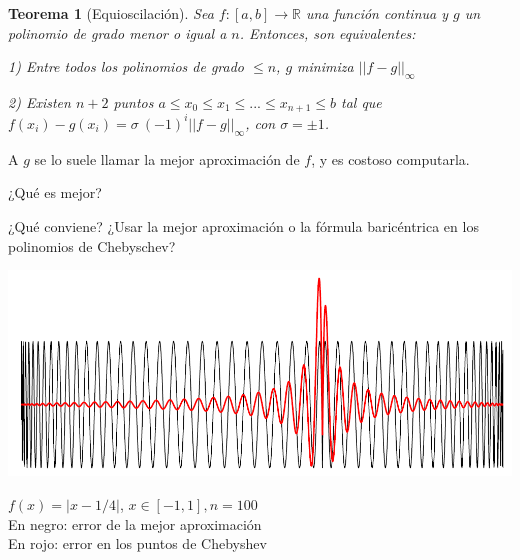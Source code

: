\documentclass{beamer}
\newtheorem{Teorema}{Teorema}
\begin{document}




\begin{frame}

    \begin{Teorema}[Equioscilación]
    Sea $f :[a,b] \rightarrow \mathbb{R}$ una función continua y $g$ un polinomio de grado menor o igual a $n$. Entonces, son equivalentes: \bigskip
    
    1) Entre todos los polinomios de grado $\leq n$, $g$ minimiza $||f -g ||_\infty$ \bigskip
    
    2) Existen $n+2$ puntos $a \leq x_0 \leq x_1 \leq ... \leq x_{n+1} \leq b$ tal que $f(x_i) - g(x_i) = \sigma\ (-1)^i  ||f -g ||_\infty$, con $\sigma = \pm 1$.\end{Teorema} \bigskip
    
    A $g$ se lo suele llamar la mejor aproximación de $f$, y es costoso computarla.
    
    
    \end{frame}

\begin{frame}{¿Qué es mejor?}


¿Qué conviene? ¿Usar la mejor aproximación o la fórmula baricéntrica en los polinomios de Chebyschev?

\includegraphics[scale=0.5]{comparacion.png}

$f(x) = |x-1/4|$, $x\in[-1,1], n = 100$ \\
En negro: error de la mejor aproximación \\
En rojo: error en los puntos de Chebyshev

\end{frame}
\end{document}
